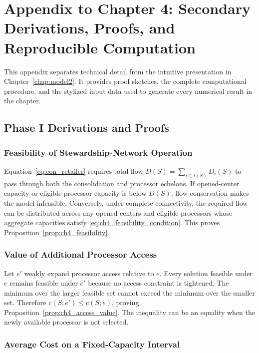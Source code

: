\chapter{Appendix to Chapter 4: Secondary Derivations, Proofs, and Reproducible Computation}
\label{app:ch4_proofs}

This appendix separates technical detail from the intuitive presentation in
Chapter~\ref{chap:model2}. It provides proof sketches, the complete
computational procedure, and the stylized input data used to generate every
numerical result in the chapter.

\section{Phase I Derivations and Proofs}

\subsection{Feasibility of Stewardship-Network Operation}

Equation~\eqref{eq:con_retailer} requires total flow
$D(S)=\sum_{i\in I(S)}D_i(S)$ to pass through both the consolidation and
processor echelons. If opened-center capacity or eligible-processor capacity is
below $D(S)$, flow conservation makes the model infeasible. Conversely, under
complete connectivity, the required flow can be distributed across any opened
centers and eligible processors whose aggregate capacities satisfy
\eqref{eq:ch4_feasibility_condition}. This proves
Proposition~\ref{prop:ch4_feasibility}.

\subsection{Value of Additional Processor Access}

Let $e'$ weakly expand processor access relative to $e$. Every solution feasible
under $e$ remains feasible under $e'$ because no access constraint is tightened.
The minimum over the larger feasible set cannot exceed the minimum over the
smaller set. Therefore $c(S;e')\leq c(S;e)$, proving
Proposition~\ref{prop:ch4_access_value}. The inequality can be an equality when
the newly available processor is not selected.

\subsection{Average Cost on a Fixed-Capacity Interval}

